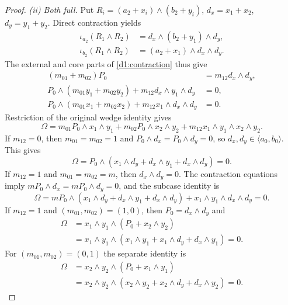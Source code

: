 \documentclass[11pt,a4paper]{article}
\theoremstyle{plain}
\theoremstyle{remark}
\begin{document}
\begin{proof}
\emph{(ii) Both full.} Put $R_i=(a_2+x_i)\wedge(b_2+y_i)$, $d_x=x_1+x_2$, $d_y=y_1+y_2$. Direct contraction yields
\begin{align*}
\iota_{a_2}(R_1\wedge R_2)&=d_x\wedge(b_2+y_1)\wedge d_y,\\
\iota_{b_2}(R_1\wedge R_2)&=(a_2+x_1)\wedge d_x\wedge d_y.
\end{align*}
The external and core parts of \eqref{d1:contraction} thus give
\begin{align*}
(m_{01}+m_{02})P_0&=m_{12}d_x\wedge d_y,\\
P_0\wedge(m_{01}y_1+m_{02}y_2)+m_{12}d_x\wedge y_1\wedge d_y&=0,\\
P_0\wedge(m_{01}x_1+m_{02}x_2)+m_{12}x_1\wedge d_x\wedge d_y&=0.
\end{align*}
Restriction of the original wedge identity gives
\[
\Omega=m_{01}P_0\wedge x_1\wedge y_1+m_{02}P_0\wedge x_2\wedge y_2
+m_{12}x_1\wedge y_1\wedge x_2\wedge y_2.
\]
If $m_{12}=0$, then $m_{01}=m_{02}=1$ and $P_0\wedge d_x=P_0\wedge d_y=0$, so $d_x,d_y\in\langle a_0,b_0\rangle$. This gives
\[
\Omega=P_0\wedge(x_1\wedge d_y+d_x\wedge y_1+d_x\wedge d_y)=0.
\]
If $m_{12}=1$ and $m_{01}=m_{02}=m$, then $d_x\wedge d_y=0$. The contraction equations imply $mP_0\wedge d_x=mP_0\wedge d_y=0$, and the subcase identity is
\[
\Omega=mP_0\wedge(x_1\wedge d_y+d_x\wedge y_1+d_x\wedge d_y)
+x_1\wedge y_1\wedge d_x\wedge d_y=0.
\]
If $m_{12}=1$ and $(m_{01},m_{02})=(1,0)$, then $P_0=d_x\wedge d_y$ and
\begin{align*}
\Omega&=x_1\wedge y_1\wedge(P_0+x_2\wedge y_2)\\
&=x_1\wedge y_1\wedge(x_1\wedge y_1+x_1\wedge d_y+d_x\wedge y_1)=0.
\end{align*}
For $(m_{01},m_{02})=(0,1)$ the separate identity is
\begin{align*}
\Omega&=x_2\wedge y_2\wedge(P_0+x_1\wedge y_1)\\
&=x_2\wedge y_2\wedge(x_2\wedge y_2+x_2\wedge d_y+d_x\wedge y_2)=0.
\end{align*}


\end{proof}
\end{document}
